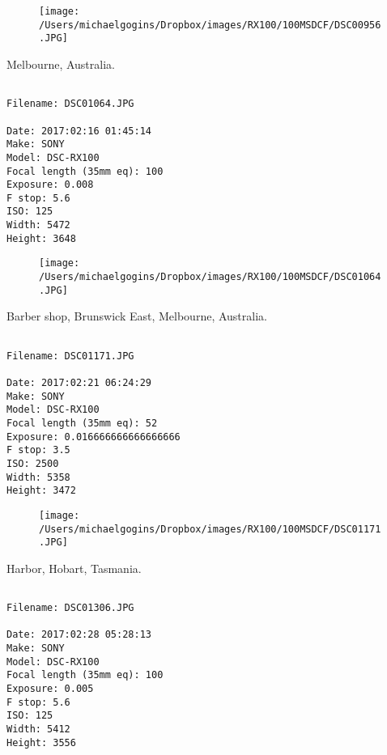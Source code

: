 \begin{figure}
\texttt{[image: /Users/michaelgogins/Dropbox/images/RX100/100MSDCF/DSC00956.JPG]}
\end{figure}
    
\clearpage
\onecolumn
\noindent Melbourne, Australia.
\noindent
\begin{lstlisting}

Filename: DSC01064.JPG

Date: 2017:02:16 01:45:14
Make: SONY
Model: DSC-RX100
Focal length (35mm eq): 100
Exposure: 0.008
F stop: 5.6
ISO: 125
Width: 5472
Height: 3648
\end{lstlisting}
\clearpage

\begin{figure}
\texttt{[image: /Users/michaelgogins/Dropbox/images/RX100/100MSDCF/DSC01064.JPG]}
\end{figure}
    
\clearpage
\onecolumn
\noindent Barber shop, Brunswick East, Melbourne, Australia.
\noindent
\begin{lstlisting}

Filename: DSC01171.JPG

Date: 2017:02:21 06:24:29
Make: SONY
Model: DSC-RX100
Focal length (35mm eq): 52
Exposure: 0.016666666666666666
F stop: 3.5
ISO: 2500
Width: 5358
Height: 3472
\end{lstlisting}
\clearpage

\begin{figure}
\texttt{[image: /Users/michaelgogins/Dropbox/images/RX100/100MSDCF/DSC01171.JPG]}
\end{figure}
    
\clearpage
\onecolumn
\noindent Harbor, Hobart, Tasmania.
\noindent
\begin{lstlisting}

Filename: DSC01306.JPG

Date: 2017:02:28 05:28:13
Make: SONY
Model: DSC-RX100
Focal length (35mm eq): 100
Exposure: 0.005
F stop: 5.6
ISO: 125
Width: 5412
Height: 3556
\end{lstlisting}
\clearpage

